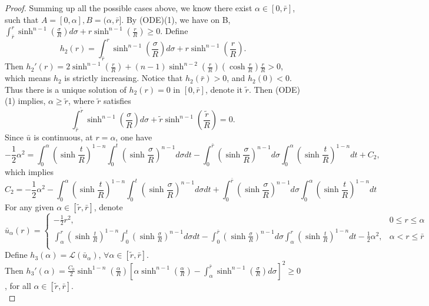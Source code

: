 \begin{proof}
	Summing up all the possible cases above, we know there exist $\alpha \in [0, \bar{r}]$, such that $A=[0,\alpha], B=(\alpha, \bar{r}]$. By (ODE)(1), we have on B, $\int_{\bar{r}}^{r}\sinh^{n-1}(\frac{\sigma}{R}) d\sigma +r\sinh^{n-1}(\frac{r}{R})\ge 0$. Define 
	$$ h_2(r)=\int_{\bar{r}}^{r}\sinh^{n-1}(\frac{\sigma}{R}) d\sigma +r\sinh^{n-1}(\frac{r}{R}).$$ 
	Then $h_2'(r) = 2\sinh^{n-1}(\frac{r}{R}) +(n-1)\sinh^{n-2}(\frac{r}{R})(\cosh\frac{r}{R})\frac{r}{R}>0$, which means $h_2$ is strictly increasing. Notice that $h_2(\bar{r})>0$, and $h_2(0)<0$. Thus there is a unique solution of $h_2(r)=0$ in $[0, \bar{r}]$, denote it $\tilde{r}$. Then (ODE)(1) implies, $\alpha\ge \tilde{r}$, where $\tilde{r}$ satisfies
	\begin{equation}
	\int_{\bar{r}}^{\tilde{r}}\sinh^{n-1}(\frac{\sigma}{R}) d\sigma +\tilde{r}\sinh^{n-1}(\frac{\tilde{r}}{R})=0.
	\end{equation}
	Since $\bar{u}$ is continuous, at $r=\alpha$, one have 
	\begin{equation*}
	-\frac{1}{2} \alpha^2 = \int_{0}^{\alpha}(\sinh\frac{t}{R})^{1-n} \int_{0}^{t} (\sinh\frac{\sigma }{R})^{n-1} d\sigma  dt  -\int_{0}^{\bar{r}} (\sinh\frac{\sigma }{R})^{n-1} d\sigma \int_{0}^{\alpha}(\sinh\frac{t}{R})^{1-n} dt +C_2,
	\end{equation*}
	which implies 
	\begin{equation*}
	C_2=-\frac{1}{2} \alpha^2 - \int_{0}^{\alpha}(\sinh\frac{t}{R})^{1-n} \int_{0}^{t} (\sinh\frac{\sigma }{R})^{n-1} d\sigma  dt  +\int_{0}^{\bar{r}} (\sinh\frac{\sigma }{R})^{n-1} d\sigma \int_{0}^{\alpha}(\sinh\frac{t}{R})^{1-n} dt 
	\end{equation*}
	For any given $\alpha \in [\tilde{r},\bar{r}]$, denote 
	\begin{equation*}
	\bar{u}_{\alpha}(r) =
	\begin{cases}
	-\frac{1}{2} r^2, &0\le r\le \alpha\\
	\int_{\alpha}^{r}(\sinh\frac{t}{R})^{1-n} \int_{0}^{t} (\sinh\frac{\sigma }{R})^{n-1} d\sigma  dt -\int_{0}^{\bar{r}} (\sinh\frac{\sigma }{R})^{n-1} d\sigma\int_{\alpha}^{r}(\sinh\frac{t}{R})^{1-n} dt -\frac{1}{2} \alpha^2  , & \alpha <r\le \bar{r}\\
	\end{cases}
	\end{equation*}
	Define $h_3(\alpha) = \mathcal{L}(\bar{u}_{\alpha})$, $\forall \alpha\in [\tilde{r}, \bar{r}]$. \\
	Then $h_3'(\alpha) = \frac{C_0}{2}\sinh^{1-n}(\frac{\alpha}{R})[\alpha\sinh^{n-1}(\frac{\alpha}{R})-\int_{\alpha}^{\bar{r}} \sinh^{n-1}(\frac{\sigma}{R}) d\sigma]^2 \ge 0$, for all $\alpha \in [\tilde{r}, \bar{r}].$ \\

\end{proof}
